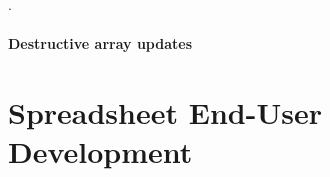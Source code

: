 \documentclass[a4paper]{article}
\begin{document}
\cite{Walinsky:1990:FPL:91556.91610, Deitz:2003:DIP:781498.781526,
  Sinkarovs:2013:SDL:2502323.2502332}.

\paragraph{Destructive array updates}

\cite{Sastry:1994:PDU:182590.182486}

\section{Spreadsheet End-User Development}
\label{sec:spreadsheet-end-user-dev}



\end{document}
